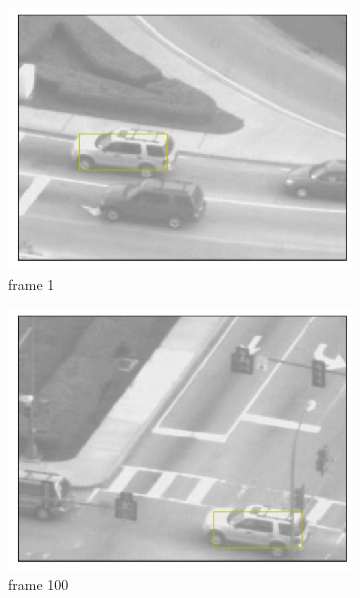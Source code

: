 \documentclass[11pt]{article}
\begin{document}
\begin{figure}[h!]
    \begin{subfigure}{.195\textwidth}
      \centering
      \includegraphics[width=.95\linewidth]{../results/carseqrects_0.png}
      \caption{frame 1}
    \end{subfigure}
    \begin{subfigure}{.195\textwidth}
      \centering
      \includegraphics[width=.95\linewidth]{../results/carseqrects_99.png}
      \caption{frame 100}
    \end{subfigure}
    \begin{subfigure}{.195\textwidth}
      \centering

\end{subfigure}
\end{figure}
\end{document}
